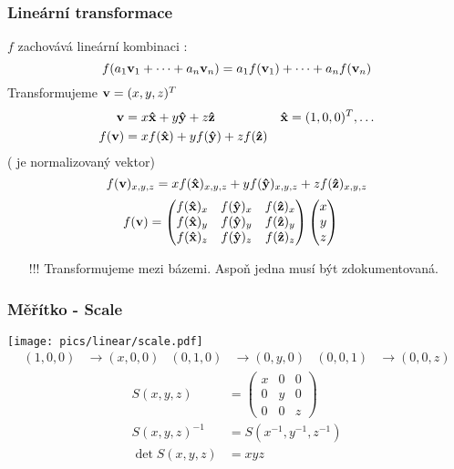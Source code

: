 \begin{frame}
  \frametitle{Lineární transformace}
  $f$ zachovává lineární kombinaci :
  \begin{equation*}
    f(a_1\mathbf{v}_1 + \dotsb + a_n\mathbf{v}_n) = a_1f(\mathbf{v}_1) + \dotsb + a_nf(\mathbf{v}_n)
  \end{equation*}
  \pause
  Transformujeme $\mathbf{v} = (x,y,z)^T$
  \begin{align*}
    \mathbf{v} &= x\mathbf{\hat{x}} + y\mathbf{\hat{y}} + z\mathbf{\hat{z}} & \mathbf{\hat{x}} = (1,0,0)^T, \dotsc \\
    f(\mathbf{v}) &= xf(\mathbf{\hat{x}}) + yf(\mathbf{\hat{y}}) + zf(\mathbf{\hat{z}})
  \end{align*}
  ( je normalizovaný vektor)
  \pause
  \begin{equation*}
    f(\mathbf{v})_{x,y,z} = xf(\mathbf{\hat{x}})_{x,y,z} + yf(\mathbf{\hat{y}})_{x,y,z} + zf(\mathbf{\hat{z}})_{x,y,z}
  \end{equation*}
  \pause
  \begin{align*}
    f(\mathbf{v}) &= \begin{pmatrix}
    f(\mathbf{\hat{x}})_x&f(\mathbf{\hat{y}})_x&f(\mathbf{\hat{z}})_x\\
    f(\mathbf{\hat{x}})_y&f(\mathbf{\hat{y}})_y&f(\mathbf{\hat{z}})_y\\
    f(\mathbf{\hat{x}})_z&f(\mathbf{\hat{y}})_z&f(\mathbf{\hat{z}})_z
  \end{pmatrix}\begin{pmatrix}x\\y\\z\end{pmatrix}
  \end{align*}
  \pause
  \begin{itemize}
    \item[\color{red}!!!] Transformujeme mezi bázemi. Aspoň jedna musí být zdokumentovaná.
  \end{itemize}
\end{frame}


\begin{frame}
    \frametitle{Měřítko - Scale}
    \texttt{[image: pics/linear/scale.pdf]}
    \begin{align*}
        (1,0,0)&\rightarrow(x,0,0) & (0,1,0)&\rightarrow(0,y,0) & (0,0,1)&\rightarrow(0,0,z)
    \end{align*}
    \pause
    \begin{align*}
        S(x, y, z) &= \begin{pmatrix}
            x & 0 & 0 \\
            0 & y & 0 \\
            0 & 0 & z
        \end{pmatrix} \\
        S(x, y, z)^{-1} &= S(x^{-1}, y^{-1}, z^{-1}) \\
        \det S(x,y,z) &= xyz 
    \end{align*}
\end{frame}

